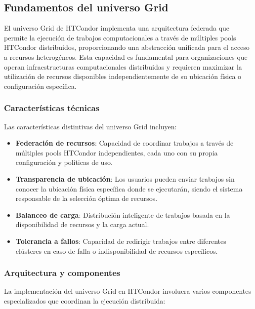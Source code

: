 \subsection{Fundamentos del universo Grid}
\noindent

El universo Grid de HTCondor implementa una arquitectura federada que permite la ejecución de trabajos computacionales a través de múltiples pools HTCondor distribuidos, proporcionando una abstracción unificada para el acceso a recursos heterogéneos. Esta capacidad es fundamental para organizaciones que operan infraestructuras computacionales distribuidas y requieren maximizar la utilización de recursos disponibles independientemente de su ubicación física o configuración específica.

\subsubsection{Características técnicas}
\noindent

Las características distintivas del universo Grid incluyen:

\begin{itemize}
	\item \textbf{Federación de recursos}: Capacidad de coordinar trabajos a través de múltiples pools HTCondor independientes, cada uno con su propia configuración y políticas de uso.

	\item \textbf{Transparencia de ubicación}: Los usuarios pueden enviar trabajos sin conocer la ubicación física específica donde se ejecutarán, siendo el sistema responsable de la selección óptima de recursos.

	\item \textbf{Balanceo de carga}: Distribución inteligente de trabajos basada en la disponibilidad de recursos y la carga actual.

	\item \textbf{Tolerancia a fallos}: Capacidad de redirigir trabajos entre diferentes clústeres en caso de falla o indisponibilidad de recursos específicos.
\end{itemize}

\subsubsection{Arquitectura y componentes}
\noindent

La implementación del universo Grid en HTCondor involucra varios componentes especializados que coordinan la ejecución distribuida:

